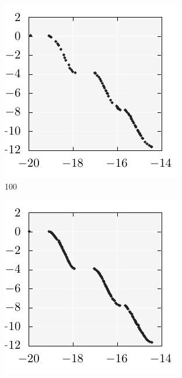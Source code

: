 \documentclass{stdlocal}
\begin{document}
    \begin{figure}[t]
      \center
      \begin{subfigure}[b]{0.24\textwidth}
        \center
        \includegraphics[width=\textwidth]{../../plots/kursawe_100.pdf}
        \caption{100}
      \end{subfigure}
      \begin{subfigure}[b]{0.24\textwidth}
        \center
        \includegraphics[width=\textwidth]{../../plots/kursawe_200.pdf}

\end{subfigure}
\end{figure}
\end{document}
